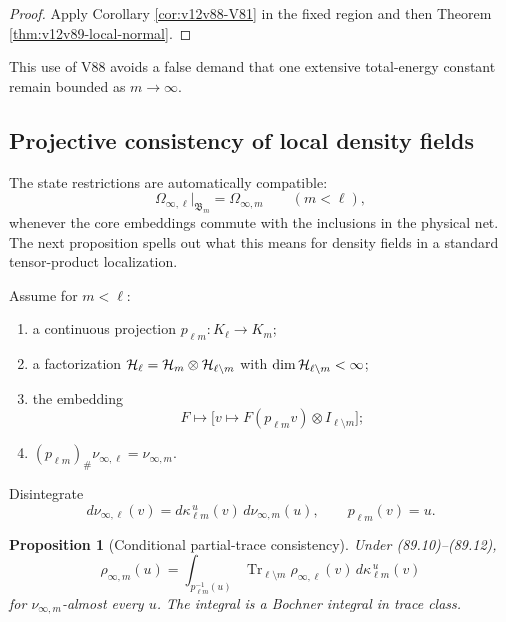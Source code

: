 \documentclass[11pt]{article}
\newtheorem{proposition}[theorem]{Proposition}
\theoremstyle{remark}
\begin{document}
\begin{proof}
Apply Corollary \ref{cor:v12v88-V81} in the fixed region and then
Theorem \ref{thm:v12v89-local-normal}.
\end{proof}

This use of V88 avoids a false demand that one extensive total-energy
constant remain bounded as \(m\to\infty\).

\subsection{Projective consistency of local density fields}

The state restrictions are automatically compatible:
\begin{equation}
 \Omega_{\infty,\ell}|_{{\mathfrak B}_m}
 =\Omega_{\infty,m}\qquad(m<\ell),                           \tag{89.10}
\end{equation}
whenever the core embeddings commute with the inclusions in the
physical net.  The next proposition spells out what this means for
density fields in a standard tensor-product localization.

Assume for \(m<\ell\):
\begin{enumerate}
\item a continuous projection \(p_{\ell m}:K_\ell\to K_m\);
\item a factorization
\({\cal H}_\ell={\cal H}_m\otimes{\cal H}_{\ell\setminus m}\) with \(\dim{\cal H}_{\ell\setminus m}<\infty\);
\item the embedding
\[
 F\longmapsto
 \bigl[v\mapsto
 F(p_{\ell m}v)\otimes I_{\ell\setminus m}\bigr];            \tag{89.11}
\]
\item \((p_{\ell m})_\#\nu_{\infty,\ell}=\nu_{\infty,m}\).
\end{enumerate}
Disintegrate
\begin{equation}
 d\nu_{\infty,\ell}(v)
 =d\kappa_{\ell m}^{\,u}(v)\,d\nu_{\infty,m}(u),
 \qquad p_{\ell m}(v)=u.                                    \tag{89.12}
\end{equation}

\begin{proposition}[Conditional partial-trace consistency]
\label{prop:v12v89-partial-trace}
Under (89.10)--(89.12),
\begin{equation}
 \boxed{\displaystyle
 \rho_{\infty,m}(u)
 =
 \int_{p_{\ell m}^{-1}(u)}
 \operatorname{Tr}_{\ell\setminus m}
 \rho_{\infty,\ell}(v)\,
 d\kappa_{\ell m}^{\,u}(v)}
                                                               \tag{89.13}
\end{equation}
for \(\nu_{\infty,m}\)-almost every \(u\).  The integral is a
Bochner integral in trace class.
\end{proposition}
\end{document}
